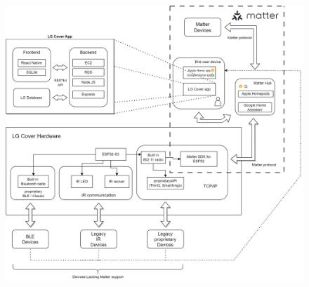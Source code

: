 \documentclass[conference]{IEEEtran}
\begin{document}
\onecolumn
\appendix
\begin{figure}[H]\centering \includegraphics[width=\textwidth]{images/structure.png}\end{figure}
\newpage
\end{document}
